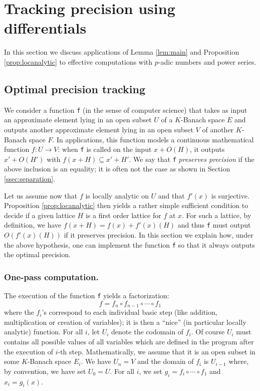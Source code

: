 \documentclass{lms}
\begin{document}
\section{Tracking precision using differentials}
\label{sec:tracking}

In this section we discuss applications of Lemma \ref{lem:main} and Proposition \ref{prop:locanalytic}
to effective computations with $p$-adic numbers and power series.

\subsection{Optimal precision tracking}
\label{ssec:opt-tracking}

We consider a function {\tt f} (in the sense of computer 
science) that takes as input an approximate element lying in an open 
subset $U$ of a $K$-Banach space $E$ and outputs another approximate
element lying in an open subset $V$ of another $K$-Banach space $F$.
In applications, this function models a continuous
mathematical function $f : U \to V$: when 
{\tt f} is called on the input $x + O(H)$, it outputs $x' + O(H')$ with 
$f(x+H) \subseteq x' + H'$. We say that {\tt f} \emph{preserves precision}
if the above inclusion is an equality; it is 
often not the case as shown in Section \ref{ssec:separation}.

Let us assume now that $f$ is locally analytic on $U$ and
that $f'(x)$ is surjective. Proposition \ref{prop:locanalytic} then 
yields a rather simple sufficient condition to decide if a given lattice 
$H$ is a first order lattice for $f$ at $x$. For such a lattice, by 
definition, we have $f(x+H) = f(x) + f'(x)(H)$ and thus {\tt f}
must output $O(f'(x)(H))$ if it preserves precision. In this section we
explain how, under the above hypothesis, one can implement the function 
{\tt f} so that it always outputs the optimal precision.

\subsubsection*{One-pass computation.}

The execution of the function {\tt f} yields a factorization:
$$f = f_n \circ f_{n-1} \circ \cdots \circ f_1$$
where the $f_i$'s correspond to each individual basic step (like 
addition, multiplication or creation of variables); it is then a
``nice'' (in particular locally analytic) function. For all 
$i$, let $U_i$ denote the codomain of $f_i$. Of course $U_i$ must
contains all possible values of all variables which are defined in the 
program after the execution of $i$-th step. Mathematically, we assume
that it is an 
open subset in some $K$-Banach space $E_i$. We have $U_n = V$ and the 
domain of $f_i$ is $U_{i-1}$ where, by convention, we have set $U_0 = 
U$.
For all $i$, we set $g_i = f_i \circ \cdots \circ f_1$ and $x_i = 
g_i(x)$. 
\end{document}
